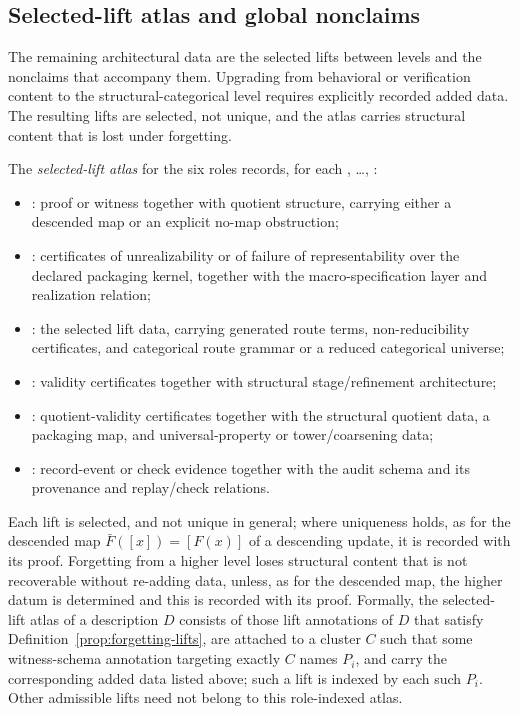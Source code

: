 \subsection{Selected-lift atlas and global nonclaims}\label{subsec:lift-atlas}

The remaining architectural data are the selected lifts between levels
and the nonclaims that accompany them. Upgrading from behavioral or
verification content to the structural-categorical level requires
explicitly recorded added data. The resulting lifts are selected, not
unique, and the atlas carries structural content that is lost under
forgetting.

\begin{definition}\label{def:selected-lift-atlas}
The \emph{selected-lift atlas} for the six roles records, for each
\Pone{}, \ldots, \Psix{}:
\begin{itemize}[topsep=2pt,itemsep=1pt]
  \item \Pone{}: proof or witness together with quotient structure, carrying
    either a descended map or an explicit no-map obstruction;
  \item \Ptwo{}: certificates of unrealizability or of failure of
    representability over the declared packaging kernel, together with the macro-specification layer and realization relation;
  \item \Pthree{}: the selected lift data,
    carrying generated route terms, non-reducibility certificates, and
    categorical route grammar or a reduced categorical universe;
  \item \Pfour{}: validity certificates together with structural
    stage/refinement architecture;
  \item \Pfive{}: quotient-validity certificates together with the
    structural quotient data, a packaging map, and universal-property or
    tower/coarsening data;
  \item \Psix{}: record-event or check evidence together with the audit
    schema and its provenance and replay/check relations.
\end{itemize}
Each lift is selected, and not unique in general; where uniqueness holds, as
for the descended map \(\bar F([x])=[F(x)]\) of a descending update, it is
recorded with its proof. Forgetting from a higher level
loses structural content that is not recoverable without re-adding data,
unless, as for the descended map, the higher datum is determined and this is
recorded with its proof. Formally, the selected-lift atlas of a description
\(D\) consists of those lift annotations of \(D\) that satisfy
Definition~\ref{prop:forgetting-lifts}, are attached to a cluster \(C\) such that
some witness-schema annotation targeting exactly \(C\) names \(P_i\), and carry
the corresponding added data listed above; such a lift is indexed by each such
\(P_i\). Other admissible lifts need
not belong to this role-indexed atlas.
\end{definition}

